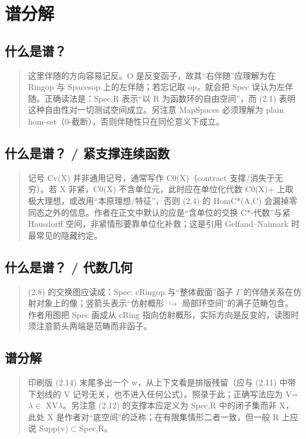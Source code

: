 \section{谱分解}
\subsection*{什么是谱？}
\begin{quote}\small
这里伴随的方向容易记反。O 是反变函子，故其“右伴随”应理解为在 Ringop 与 Spacesop 上的左伴随；若忘记取 op，就会把 Spec 误认为左伴随。正确读法是：Spec,R 表示“以 R 为函数环的自由空间”，而 (2.1) 表明这种自由性对一切测试空间成立。另注意 MapSpaces 必须理解为 plain hom-set（0-截断），否则伴随性只在同伦意义下成立。
\end{quote}

\subsection*{什么是谱？ / 紧支撑连续函数}
\begin{quote}\small
记号 Cv(X) 并非通用记号，通常写作 C0(X)（contract 支撑/消失于无穷）。若 X 非紧，C0(X) 不含单位元，此时应在单位化代数 C0(X)+ 上取极大理想，或改用“本原理想/特征”，否则 (2.4) 的 HomC*(A,C) 会漏掉零同态之外的信息。作者在正文中默认的应是“含单位的交换 C*-代数”与紧 Hausdorff 空间，非紧情形要靠单位化补救；这是引用 Gelfand--Naimark 时最常见的隐藏约定。
\end{quote}

\subsection*{什么是谱？ / 代数几何}
\begin{quote}\small
(2.8) 的交换图应读成：Spec: cRingop 与“整体截面”函子 $\Gamma$ 的伴随关系在仿射对象上的像；竖箭头表示“仿射概形 $\hookrightarrow$ 局部环空间”的满子范畴包含。作者用图把 Spec 画成从 cRing 指向仿射概形，实际方向是反变的，读图时须注意箭头两端是范畴而非函子。
\end{quote}

\subsection*{谱分解}
\begin{quote}\small
印刷版 (2.14) 末尾多出一个 w，从上下文看是排版残留（应与 (2.11) 中带下划线的 V 记号无关，也不进入任何公式）。照录于此；正确写法应为 V=$\lambda$$\in$ XV$\lambda$。另注意 (2.12) 的支撑本应定义为 Spec,R 中的闭子集而非 X，此处 X 是作者对“底空间”的泛称；在有限集情形二者一致，但一般 R 上应说 Supp(v)$\subset$Spec,R。
\end{quote}

